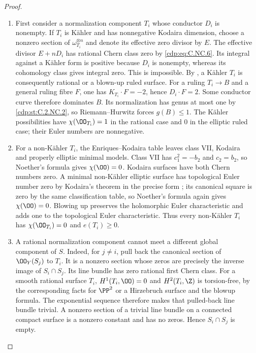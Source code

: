 \begin{proof}

\begin{enumerate}[label=\arabic*.,leftmargin=*]
\item First consider a normalization component $T_i$ whose conductor $D_i$ is nonempty. If $T_i$ is Kähler and has nonnegative Kodaira dimension, choose a nonzero section of $\omega_{T_i}^{\otimes n}$ and denote its effective zero divisor by $E$. The effective divisor $E+nD_i$ has rational Chern class zero by \eqref{cdp:eq:C.NC.6}. Its integral against a Kähler form is positive because $D_i$ is nonempty, whereas its cohomology class gives integral zero. This is impossible. By \cite[Theorem~2.2, p.~843]{Peters2021}, a Kähler $T_i$ is consequently rational or a blown-up ruled surface. For a ruling $T_i\to B$ and a general ruling fibre $F$, one has $K_{T_i}\cdot F=-2$, hence $D_i\cdot F=2$. Some conductor curve therefore dominates $B$. Its normalization has genus at most one by \ref{cdp:st:C.2.NC.2}, so Riemann--Hurwitz forces $g(B)\le1$. The Kähler possibilities have
$\chi(\OO_{T_i})=1$ in the rational case and $0$ in the elliptic ruled case; their Euler numbers are nonnegative.

\item For a non-Kähler $T_i$, the Enriques--Kodaira table \cite[Theorem~2.2, p.~843]{Peters2021} leaves class VII, Kodaira and properly elliptic minimal models. Class VII has $c_1^2=-b_2$ and $c_2=b_2$, so Noether's formula gives $\chi(\OO)=0$. Kodaira surfaces have both Chern numbers zero. A minimal non-Kähler elliptic surface has topological Euler number zero by Kodaira's theorem in the precise form \cite[Theorem~3.2, p.~16]{BMS2012}; its canonical square is zero by the same classification table, so Noether's formula again gives $\chi(\OO)=0$. Blowing up preserves the holomorphic Euler characteristic and adds one to the topological Euler characteristic. Thus every non-Kähler $T_i$ has $\chi(\OO_{T_i})=0$ and $e(T_i)\ge0$.

\item A rational normalization component cannot meet a different global component of $S$. Indeed, for $j\ne i$, pull back the canonical section of $\OO_Y(S_j)$ to $T_i$. It is a nonzero section whose zeros are precisely the inverse image of $S_i\cap S_j$. Its line bundle has zero rational first Chern class. For a smooth rational surface $T_i$, $H^1(T_i,\OO)=0$ and $H^2(T_i,\Z)$ is torsion-free, by the corresponding facts for $\PP^2$ or a Hirzebruch surface and the blowup formula. The exponential sequence therefore makes that pulled-back line bundle trivial. A nonzero section of a trivial line bundle on a connected compact surface is a nonzero constant and has no zeros. Hence $S_i\cap S_j$ is empty.


\end{enumerate}
\end{proof}
